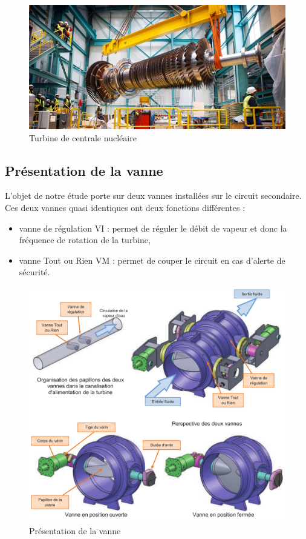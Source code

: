 \begin{figure}[ht!]
\begin{center}
 \includegraphics[width=0.5\linewidth]{img/fig03}
\end{center}
\caption{Turbine de centrale nucléaire}
\label{fig03}
\end{figure}

\subsection{Présentation de la vanne}

L'objet de notre étude porte sur deux vannes installées sur le circuit secondaire. Ces deux vannes quasi identiques ont deux fonctions différentes :
\begin{itemize}
 \item vanne de régulation VI : permet de réguler le débit de vapeur et donc la fréquence de rotation de la turbine,
 \item vanne Tout ou Rien VM : permet de couper le circuit en cas d'alerte de sécurité.
\end{itemize}
 
\begin{figure}[ht!]
\begin{center}
 \includegraphics[width=0.8\linewidth]{img/fig04}
\end{center}
\caption{Présentation de la vanne}
\label{fig04}
\end{figure}

